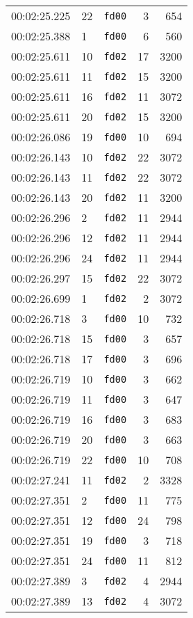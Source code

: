 \documentclass{article}
\begin{document}
\begin{longtable}{lllrr}
00:02:25.225 & 22 & \texttt{fd00} & 3 & 654 \\
00:02:25.388 & 1 & \texttt{fd00} & 6 & 560 \\
00:02:25.611 & 10 & \texttt{fd02} & 17 & 3200 \\
00:02:25.611 & 11 & \texttt{fd02} & 15 & 3200 \\
00:02:25.611 & 16 & \texttt{fd02} & 11 & 3072 \\
00:02:25.611 & 20 & \texttt{fd02} & 15 & 3200 \\
00:02:26.086 & 19 & \texttt{fd00} & 10 & 694 \\
00:02:26.143 & 10 & \texttt{fd02} & 22 & 3072 \\
00:02:26.143 & 11 & \texttt{fd02} & 22 & 3072 \\
00:02:26.143 & 20 & \texttt{fd02} & 11 & 3200 \\
00:02:26.296 & 2 & \texttt{fd02} & 11 & 2944 \\
00:02:26.296 & 12 & \texttt{fd02} & 11 & 2944 \\
00:02:26.296 & 24 & \texttt{fd02} & 11 & 2944 \\
00:02:26.297 & 15 & \texttt{fd02} & 22 & 3072 \\
00:02:26.699 & 1 & \texttt{fd02} & 2 & 3072 \\
00:02:26.718 & 3 & \texttt{fd00} & 10 & 732 \\
00:02:26.718 & 15 & \texttt{fd00} & 3 & 657 \\
00:02:26.718 & 17 & \texttt{fd00} & 3 & 696 \\
00:02:26.719 & 10 & \texttt{fd00} & 3 & 662 \\
00:02:26.719 & 11 & \texttt{fd00} & 3 & 647 \\
00:02:26.719 & 16 & \texttt{fd00} & 3 & 683 \\
00:02:26.719 & 20 & \texttt{fd00} & 3 & 663 \\
00:02:26.719 & 22 & \texttt{fd00} & 10 & 708 \\
00:02:27.241 & 11 & \texttt{fd02} & 2 & 3328 \\
00:02:27.351 & 2 & \texttt{fd00} & 11 & 775 \\
00:02:27.351 & 12 & \texttt{fd00} & 24 & 798 \\
00:02:27.351 & 19 & \texttt{fd00} & 3 & 718 \\
00:02:27.351 & 24 & \texttt{fd00} & 11 & 812 \\
00:02:27.389 & 3 & \texttt{fd02} & 4 & 2944 \\
00:02:27.389 & 13 & \texttt{fd02} & 4 & 3072 \\

\end{longtable}
\end{document}
